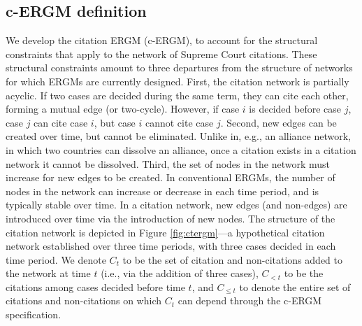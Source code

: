 \documentclass[headsepline=true, abstracton]{scrartcl}
\begin{document}
\subsection{c-ERGM definition}

We develop the citation ERGM (c-ERGM), to account for the structural constraints that apply to the network of Supreme Court citations. These structural constraints amount to three departures from the structure of networks for which ERGMs are currently designed. First, the citation network is partially acyclic. If two cases are decided during the same term, they can cite each other, forming a mutual edge (or two-cycle). However, if case $i$ is decided before case $j$, case $j$ can cite case $i$, but case $i$ cannot cite case $j$. Second, new edges can be created over time, but cannot be eliminated. Unlike in, e.g., an alliance network, in which two countries can dissolve an alliance, once a citation exists in a citation network it cannot be dissolved. Third, the set of nodes in the network must increase for new edges to be created. In conventional ERGMs, the number of nodes in the network can increase or decrease in each time period, and is typically stable over time. In a citation network, new edges (and non-edges) are introduced over time via the introduction of new nodes. The structure of the citation network is depicted in Figure \ref{fig:ctergm}---a hypothetical citation network established over three time periods, with three cases decided in each time period. We denote $C_t$ to be the set of citation and non-citations added to the network at time $t$ (i.e., via the addition of three cases), $C_{ <t}$ to be the citations among cases decided before time $t$, and $C_{ \leq t}$ to denote the entire set of citations and non-citations on which $C_t$ can depend through the c-ERGM specification.
\end{document}
